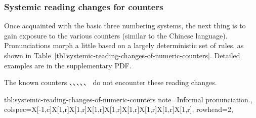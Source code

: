 \documentclass[../nihongo-gakushuu-kyouzai-grammar.tex]{subfiles}
\begin{document}
\subsubsection{Systemic reading changes for counters} \label{sec:systemic-reading-changes-for-counters}
Once acquainted with the basic three numbering systems, the next thing is to gain exposure to the various counters (similar to the Chinese language). Pronunciations morph a little based on a largely deterministic set of rules, as shown in Table~\ref{tbl:systemic-reading-changes-of-numeric-counters}. Detailed examples are in the supplementary PDF.

The known counters 、、、、、 do not encounter these reading changes.

{tbl:systemic-reading-changes-of-numeric-counters}  %
{
    note{\dagger}={Informal pronunciation.},
}  %
{
    colspec={X[-1,c]X[1,r]X[1,r]X[1,r]X[1,r]X[1,r]X[1,r]X[1,r]X[1,r]},
    rowhead=2,
}  %
\end{document}
